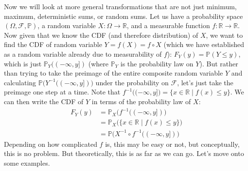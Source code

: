 \documentclass{article}
\theoremstyle{definition}
\theoremstyle{remark}
\theoremstyle{definition}
\begin{document}
Now we will look at more general transformations that are not just minimum, maximum, deterministic sums, or random sums. Let us have a probability space $(\Omega, \mathcal{F}, \mathbb{P})$, a random variable $X: \Omega \rightarrow \mathbb{R}$, and a measurable function $f: \mathbb{R} \rightarrow \mathbb{R}$. Now given that we know the CDF (and therefore distribution) of $X$, we want to find the CDF of random variable $Y = f(X) = f \circ X$ (which we have established as a random variable already due to measurability of $f$): $F_Y (y) = \mathbb{P}(Y \leq y)$, which is just $\mathbb{P}_Y ((-\infty, y])$ (where $\mathbb{P}_Y$ is the probability law on $Y$). But rather than trying to take the preimage of the entire composite random variable $Y$ and calculating $\mathbb{P}\big( Y^{-1}((-\infty, y]) \big)$ under the probability on $\mathcal{F}$, let's just take the preimage one step at a time. Note that $f^{-1} \big( (-\infty, y] \big) = \{x \in \mathbb{R} \mid f(x) \leq y\}$. We can then write the CDF of $Y$ in terms of the probability law of $X$: 
\begin{align*}
    F_Y (y) & = \mathbb{P}_X \big( f^{-1} ((-\infty, y]) \big) \\
    & = \mathbb{P}_X \big( \{x \in \mathbb{R} \mid f(x) \leq y\} \big) \\
    & = \mathbb{P} \big( X^{-1} \circ f^{-1} ((-\infty, y]) \big) 
\end{align*}
Depending on how complicated $f$ is, this may be easy or not, but conceptually, this is no problem. But theoretically, this is as far as we can go. Let's move onto some examples. 
\end{document}
